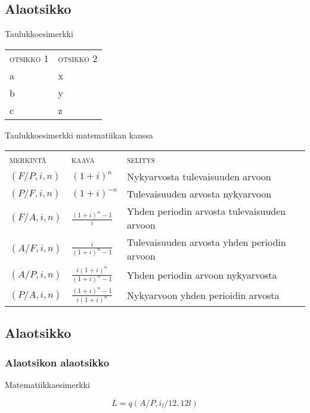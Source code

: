 \documentclass[12pt,a4paper,finnish]{article}
\theoremstyle{plain}
\theoremstyle{definition}
\theoremstyle{remark}
\theoremstyle{figure}
\begin{document}
\subsection{Alaotsikko}

Taulukkoesimerkki

\begin{tabular}{l l}

\textsc{otsikko 1} & \textsc{otsikko 2} \\

    a & x \\
    b & y \\
    c & z \\

\end{tabular}

Taulukkoesimerkki matematiikan kanssa

\begin{tabular}{l l l}
    \textsc{merkintä} & \textsc{kaava} & \textsc{selitys} \\

    $(F/P, i, n)$ & ${(1+i)}^n$ & Nykyarvosta tulevaisuuden arvoon \\
    $(P/F, i, n)$ & ${(1+i)}^{-n}$ & Tulevaisuuden arvosta nykyarvoon \\
    $(F/A, i, n)$ & $\frac{{(1+i)}^n-1}{i}$ & Yhden periodin arvosta tulevaisuuden arvoon \\
    $(A/F, i, n)$ & $\frac{i}{{(1+i)}^n-1}$ & Tulevaisuuden arvosta yhden periodin arvoon \\
    $(A/P, i, n)$ & $\frac{i{(1+i)}^n}{{(1+i)}^n-1}$ & Yhden periodin arvoon nykyarvosta \\
    $(P/A, i, n)$ & $\frac{{(1+i)}^n-1}{i{(1+i)}^n}$ & Nykyarvoon yhden perioidin arvosta \\
    
\end{tabular}

\subsection{Alaotsikko}

\subsubsection{Alaotsikon alaotsikko}

Matematiikkaesimerkki

\begin{equation}
    L = q(A/P, i_l/12, 12l)
\end{equation}
 
\end{document}
